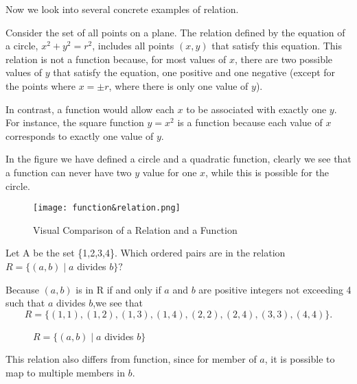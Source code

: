 Now we look into several concrete examples of relation.
\begin{example}
    Consider the set of all points on a plane. The relation defined by the equation of a circle, $x^2 + y^2 = r^2$, includes all points $(x, y)$ that satisfy this equation. This relation is not a function because, for most values of $x$, there are two possible values of $y$ that satisfy the equation, one positive and one negative (except for the points where $x = \pm r$, where there is only one value of $y$).
    
    In contrast, a function would allow each $x$ to be associated with exactly one $y$. For instance, the square function $y = x^2$ is a function because each value of $x$ corresponds to exactly one value of $y$.

    In the figure we have defined a circle and a quadratic function, clearly 
    we see that a function can never have two $y$ value for one $x$, while 
    this is possible for the circle.
    \end{example}
\begin{figure}[H]
    \centering
    \texttt{[image: function\&relation.png]}
    \caption{Visual Comparison of a Relation and a Function}
\end{figure}
\begin{example}
	Let A be the set \{1,2,3,4\}. Which ordered pairs are in the relation $R=\{(a,b)\mid a$ divides $b\}?$
	\begin{solution}
		 Because $(a,b)$ is in R if and only if $a$ and $b$ are positive integers not exceeding 4 such that $a$ divides $b$,we see that
		$$
		R=\{(1,1),(1,2),(1,3),(1,4),(2,2),(2,4),(3,3),(4,4)\}.
		$$
	\end{solution}
\begin{figure}[H]
	\centering
{}
\caption{$R=\{(a,b)\mid a$ divides $b\}$}
\end{figure}
This relation also differs from function, since for member of $a$, it is possible
to map to multiple members in $b$.
\end{example}
